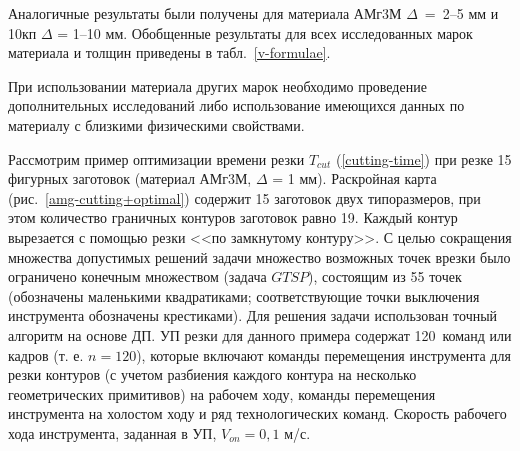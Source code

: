 Аналогичные результаты были получены для материала
АМг3М $\Delta$~=~2--5 мм
и 10кп $\Delta$ = 1--10 мм.
Обобщенные результаты для всех исследованных марок материала и толщин
приведены в табл.~\ref{v-formulae}.

При использовании материала других марок
необходимо проведение дополнительных исследований
либо использование имеющихся данных по материалу
с близкими физическими свойствами.

Рассмотрим пример оптимизации времени резки
$T_{cut}$
(\ref{cutting-time})
при резке 15 фигурных заготовок
(материал АМг3М, $\Delta$ = 1 мм).
Раскройная карта
(рис.~\ref{amg-cutting+optimal})
содержит 15 заготовок двух типоразмеров,
при этом количество граничных контуров заготовок равно 19.
Каждый контур вырезается с помощью резки
<<по замкнутому контуру>>.
С целью сокращения множества допустимых решений
задачи множество возможных точек врезки было
ограничено конечным множеством
(задача $GTSP$),
состоящим из 55 точек
(обозначены маленькими квадратиками;
соответствующие точки выключения инструмента обозначены крестиками).
Для решения задачи использован точный алгоритм на основе ДП.
УП резки для данного примера содержат 120~команд или кадров
(т. е. $n=120$),
которые включают команды перемещения инструмента
для резки контуров
(с учетом разбиения каждого контура на несколько геометрических примитивов)
на рабочем ходу,
команды перемещения инструмента на холостом ходу
и ряд технологических команд.
Скорость рабочего хода инструмента, заданная в УП,
$V_{on}=0,1$ м/с.


